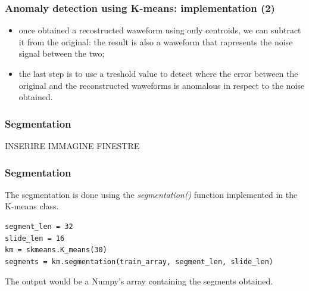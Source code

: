 \documentclass[xcolor ={table,usenames,dvipsnames}]{beamer}
\theoremstyle{definition}
\begin{document}
	\begin{frame}
		\frametitle{Anomaly detection using K-means: implementation (2)}
		\begin{itemize}
			\item once obtained a recostructed waweform using only centroids, we can subtract it from the original: the result is also a waweform that rapresents the noise signal between the two;
			\item the last step is to use a treshold value to detect where the error between the original and the reconstructed waweforms is anomalous in respect to the noise obtained. 
		\end{itemize}
	\end{frame}

	\begin{frame}
		\frametitle{Segmentation}
		INSERIRE IMMAGINE FINESTRE
		
	\end{frame}

	\begin{frame}[fragile]
		\frametitle{Segmentation}
		
		The segmentation is done using the \textit{segmentation()} function implemented in the K-means class.
		
		\begin{lstlisting}
segment_len = 32
slide_len = 16
km = skmeans.K_means(30)
segments = km.segmentation(train_array, segment_len, slide_len)
		\end{lstlisting}
		
		The output would be a Numpy's array containing the segments obtained.
			 
		\end{frame}
\end{document}
